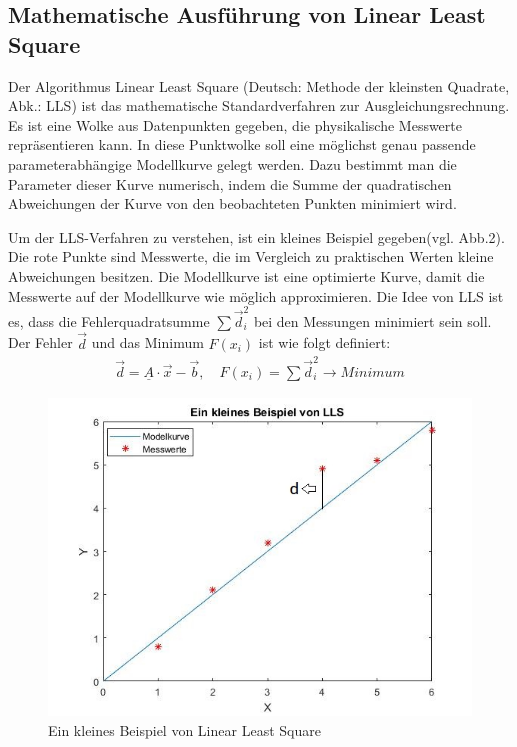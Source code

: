 \subsection{Mathematische Ausführung von Linear Least Square}

Der Algorithmus Linear Least Square (Deutsch: Methode der kleinsten Quadrate, Abk.: LLS) ist das mathematische Standardverfahren zur Ausgleichungsrechnung. Es ist eine Wolke aus Datenpunkten gegeben, die physikalische Messwerte repräsentieren kann. In diese Punktwolke soll eine möglichst genau passende parameterabhängige Modellkurve gelegt werden. Dazu bestimmt man die Parameter dieser Kurve numerisch, indem die Summe der quadratischen Abweichungen der Kurve von den beobachteten Punkten minimiert wird.


Um der LLS-Verfahren zu verstehen, ist ein kleines Beispiel gegeben(vgl. Abb.2). Die rote Punkte sind Messwerte, die im Vergleich zu praktischen Werten kleine Abweichungen besitzen. Die Modellkurve ist eine optimierte Kurve, damit die Messwerte auf der Modellkurve wie möglich approximieren. Die Idee von LLS ist es, dass die Fehlerquadratsumme $ \sum \vec{d}^{2}_{i} $ bei den Messungen minimiert sein soll. Der Fehler $\vec{d}$ und das Minimum $ F(x_{i}) $ ist wie folgt definiert:
\begin{align}
\vec{d}=\underline{A} \cdot \vec{x}- \vec{b}, \quad F(x_{i})= \sum \vec{d}^{2}_{i} \rightarrow{} Minimum
\end{align}

\begin{figure}[H]
	\centering
	\includegraphics[scale=0.6]{img/BeispielvonLLS.jpg}
	\caption{Ein kleines Beispiel von Linear Least Square}
\end{figure}

